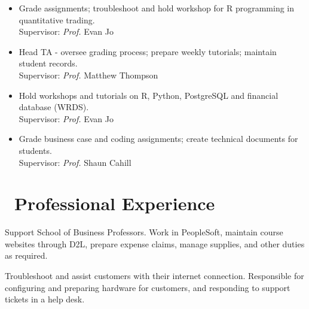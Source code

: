 \documentclass{resume}
\begin{document}
\begin{itemize}
  \item {}
  {Grade assignments; troubleshoot and hold workshop for R programming in quantitative trading.}\\
  {Supervisor: \emph{Prof.} Evan Jo}\\
  \vspace{-0.5em}
  
  \item {}
  {Head TA - oversee grading process; prepare weekly tutorials; maintain student records.}\\
  {Supervisor: \emph{Prof.} Matthew Thompson}\\
  \vspace{-0.5em}
  
  \item {}
  {Hold workshops and tutorials on R, Python, PostgreSQL and financial database (WRDS).}\\
  {Supervisor: \emph{Prof.} Evan Jo}\\
  \vspace{-0.5em}
  
  \item {}
  {Grade business case and coding assignments; create technical documents for students.}\\
  {Supervisor: \emph{Prof.} Shaun Cahill}\\
  \vspace{-0.5em}
  
\end{itemize}


\section{\faBriefcase\ Professional Experience}
Support School of Business Professors. Work in PeopleSoft, maintain course websites through D2L, prepare expense claims, manage supplies, and other duties as required. 

Troubleshoot and assist customers with their internet connection. Responsible for configuring and preparing hardware for customers, and responding to support tickets in a help desk.
\end{document}
